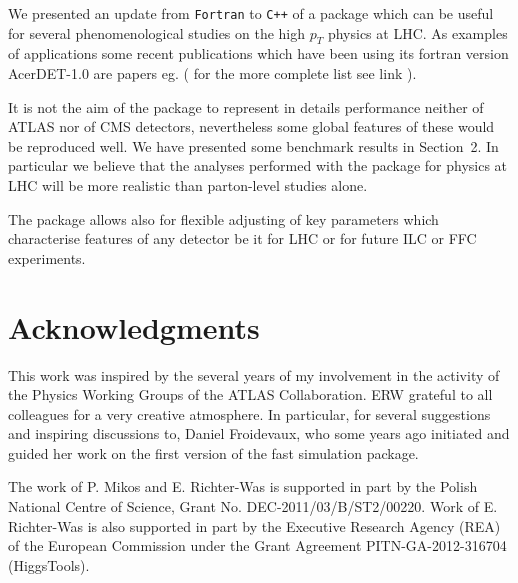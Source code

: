 We presented an update from {\tt Fortran} to {\tt C++} of a package which can be 
useful for several phenomenological studies on the high $p_T$ physics at LHC.
As examples of applications some recent publications which have been using
its fortran version AcerDET-1.0 \cite{AcerDET-1.0} are papers eg. 
\cite{Nagata2015, Schaetzel2014, Choi2012, Aguilar-Saavedra2012}
( for the more complete list see link \cite{AcerDET-1.0-citations} ). 

It is not the aim of the package to represent in details performance
neither of ATLAS nor of CMS detectors, nevertheless some global features
of these would be reproduced well. We have presented some benchmark results
in Section~2. In particular we believe that the
analyses performed with the package for physics at LHC will be more
realistic than parton-level studies alone.

The package allows also for flexible 
adjusting of key parameters which characterise features of any
detector be it for LHC or for future ILC or FFC experiments. 


\section*{Acknowledgments}

This work was inspired by the several years of my involvement in the activity 
of the  Physics Working Groups of the ATLAS Collaboration.
ERW  grateful to all colleagues for a very creative atmosphere.
In particular, for several suggestions and inspiring discussions to,
Daniel Froidevaux, who  some years ago initiated and guided 
her work on the first version of the fast simulation package.

The work of P. Mikos and E. Richter-Was is supported in part by the Polish National 
Centre of Science, Grant No. DEC-2011/03/B/ST2/00220. 
Work of E. Richter-Was is also supported  in part by  the Executive Research Agency (REA) 
of the European Commission under the Grant Agreement PITN-GA-2012-316704 (HiggsTools).

